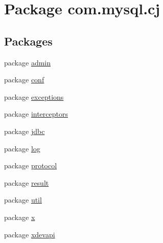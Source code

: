 \hypertarget{namespacecom_1_1mysql_1_1cj}{}\section{Package com.\+mysql.\+cj}
\label{namespacecom_1_1mysql_1_1cj}
\subsection*{Packages}
\begin{DoxyCompactItemize}
\item 
package \mbox{\hyperlink{namespacecom_1_1mysql_1_1cj_1_1admin}{admin}}
\item 
package \mbox{\hyperlink{namespacecom_1_1mysql_1_1cj_1_1conf}{conf}}
\item 
package \mbox{\hyperlink{namespacecom_1_1mysql_1_1cj_1_1exceptions}{exceptions}}
\item 
package \mbox{\hyperlink{namespacecom_1_1mysql_1_1cj_1_1interceptors}{interceptors}}
\item 
package \mbox{\hyperlink{namespacecom_1_1mysql_1_1cj_1_1jdbc}{jdbc}}
\item 
package \mbox{\hyperlink{namespacecom_1_1mysql_1_1cj_1_1log}{log}}
\item 
package \mbox{\hyperlink{namespacecom_1_1mysql_1_1cj_1_1protocol}{protocol}}
\item 
package \mbox{\hyperlink{namespacecom_1_1mysql_1_1cj_1_1result}{result}}
\item 
package \mbox{\hyperlink{namespacecom_1_1mysql_1_1cj_1_1util}{util}}
\item 
package \mbox{\hyperlink{namespacecom_1_1mysql_1_1cj_1_1x}{x}}
\item 
package \mbox{\hyperlink{namespacecom_1_1mysql_1_1cj_1_1xdevapi}{xdevapi}}
\end{DoxyCompactItemize}
